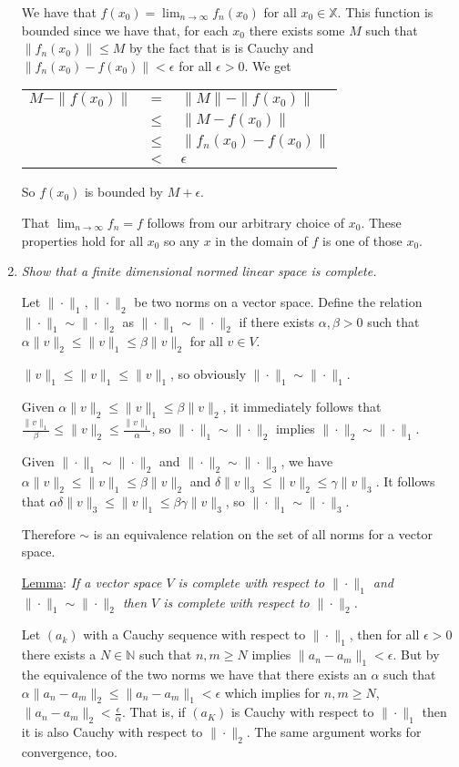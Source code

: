 \documentclass[11pt]{article}
\begin{document}
\begin{enumerate}
We have that $f(x_0) = \lim_{n \rightarrow \infty} f_n(x_0)$ for all $x_0 \in \mathbb{X}$.  This function is bounded since we have that, for each $x_0$ there exists some $M$ such that $\|f_n(x_0)\| \leq M$ by the fact that is is Cauchy and $\|f_n(x_0) - f(x_0)\| < \epsilon$ for all $\epsilon > 0$.  We get

\begin{tabular}{lll}
$M - \|f(x_0)\|$	&$=$&		$\|M\| - \|f(x_0)\|$ \\
			&$\leq$&	$\|M - f(x_0)\|$ \\
			&$\leq$&	$\|f_n(x_0) - f(x_0)\|$ \\
			&$<$&		$\epsilon$
\end{tabular}

So $f(x_0)$ is bounded by $M + \epsilon$.

That $\lim_{n \rightarrow \infty} f_n = f$ follows from our arbitrary choice of $x_0$.  These properties hold for all $x_0$ so any $x$ in the domain of $f$ is one of those $x_0$.

\item \emph{Show that a finite dimensional normed linear space is complete.}

Let $\|\cdot\|_1,\|\cdot\|_2$ be two norms on a vector space.  Define the relation $\|\cdot\|_1 \sim \|\cdot\|_2$ as $\|\cdot\|_1 \sim \|\cdot\|_2$ if there exists $\alpha,\beta > 0$ such that $\alpha\|v\|_2 \leq \|v\|_1 \leq \beta\|v\|_2$ for all $v \in V$.

$\|v\|_1 \leq \|v\|_1 \leq \|v\|_1$, so obviously $\|\cdot\|_1 \sim \|\cdot\|_1$.

Given $\alpha\|v\|_2 \leq \|v\|_1 \leq \beta\|v\|_2$, it immediately follows that $\frac{\|v\|_1}{\beta} \leq \|v\|_2 \leq \frac{\|v\|_1}{\alpha}$, so $\|\cdot\|_1 \sim \|\cdot\|_2$ implies $\|\cdot\|_2 \sim \|\cdot\|_1$.

Given $\|\cdot\|_1 \sim \|\cdot\|_2$ and $\|\cdot\|_2 \sim \|\cdot\|_3$, we have $\alpha\|v\|_2 \leq \|v\|_1 \leq \beta\|v\|_2$ and $\delta\|v\|_3 \leq \|v\|_2 \leq \gamma\|v\|_3$.  It follows that $\alpha\delta\|v\|_3 \leq \|v\|_1 \leq \beta\gamma\|v\|_3$, so $\|\cdot\|_1 \sim \|\cdot\|_3$.

Therefore $\sim$ is an equivalence relation on the set of all norms for a vector space.

\underline{Lemma}: \emph{If a vector space $V$ is complete with respect to $\|\cdot\|_1$ and $\|\cdot\|_1 \sim \|\cdot\|_2$ then $V$ is complete with respect to $\|\cdot\|_2$.}

Let $(a_k)$ with a Cauchy sequence with respect to $\|\cdot\|_1$, then for all $\epsilon > 0$ there exists a $N \in \mathbb{N}$ such that $n,m \geq N$ implies $\|a_n - a_m\|_1 < \epsilon$.  But by the equivalence of the two norms we have that there exists an $\alpha$ such that $\alpha\|a_n - a_m\|_2 \leq \|a_n - a_m\|_1 < \epsilon$ which implies for $n,m \geq N$, $\|a_n - a_m\|_2 < \frac{\epsilon}{\alpha}$.  That is, if $(a_K)$ is Cauchy with respect to $\|\cdot\|_1$ then it is also Cauchy with respect to $\|\cdot\|_2$.  The same argument works for convergence, too.


\end{enumerate}
\end{document}
